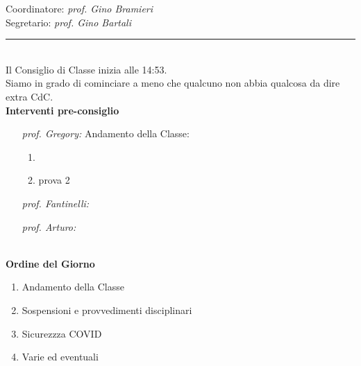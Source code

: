 \documentclass[11pt]{article}
\begin{document}
\begin{center}
\begin{multicols}{2}
	Coordinatore: {\em prof. Gino Bramieri}\\
	Segretario: {\em prof. Gino Bartali}\\ 
	\end{multicols}
\end{center}
\par\noindent\rule{\textwidth}{0.4pt}\\
Il Consiglio di Classe inizia alle 14:53.\\
Siamo in grado di cominciare a meno che qualcuno non abbia qualcosa da dire extra CdC.\\[6pt]
{\bf Interventi pre-consiglio}
\begin{enumerate}[label=\roman*]
	\item [\em prof. Gregory:]Andamento della Classe:
	\begin{enumerate}
		\item \lipsum[2]
		\item prova 2
	\end{enumerate}
	\item [\em prof. Fantinelli:]\lipsum[2]
	\item [\em prof. Arturo:]\lipsum[3]
\end{enumerate}
\vspace{12pt}
\par\noindent\dotfill{}\\[10pt]
{\bf Ordine del Giorno}
\begin{enumerate}
	\item Andamento della Classe
	\item Sospensioni e provvedimenti disciplinari
	\item Sicurezzza COVID
	\item Varie ed eventuali
\end{enumerate}
\end{document}
